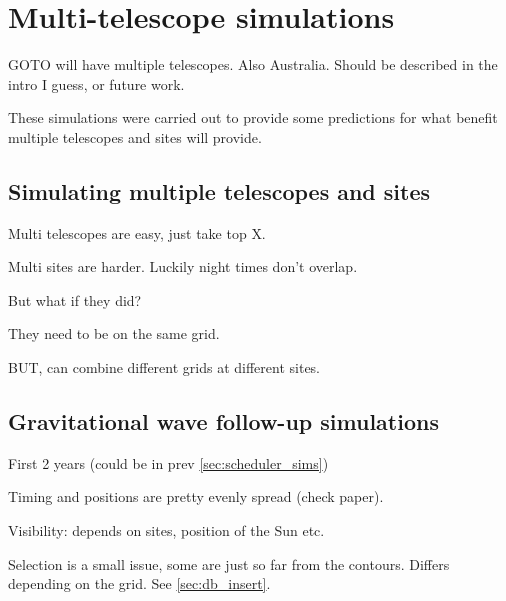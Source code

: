 \section{Multi-telescope simulations}
\label{sec:multitel_sims}
\begin{colsection}


\begin{colsection}

GOTO will have multiple telescopes. Also Australia. Should be described in the intro I guess, or future work.

These simulations were carried out to provide some predictions for what benefit multiple telescopes and sites will provide.


\end{colsection}


\subsection{Simulating multiple telescopes and sites}
\label{sec:multi_site}
\begin{colsection}

Multi telescopes are easy, just take top X.

Multi sites are harder. Luckily night times don't overlap.

But what if they did?

They need to be on the same grid.

BUT, can combine different grids at different sites.

\end{colsection}


\subsection{Gravitational wave follow-up simulations}
\label{sec:gw_sims}
\begin{colsection}

First 2 years (could be in prev \autoref{sec:scheduler_sims})

Timing and positions are pretty evenly spread (check paper).

Visibility: depends on sites, position of the Sun etc.

Selection is a small issue, some are just so far from the contours. Differs depending on the grid. See \autoref{sec:db_insert}.


\end{colsection}
\end{colsection}
